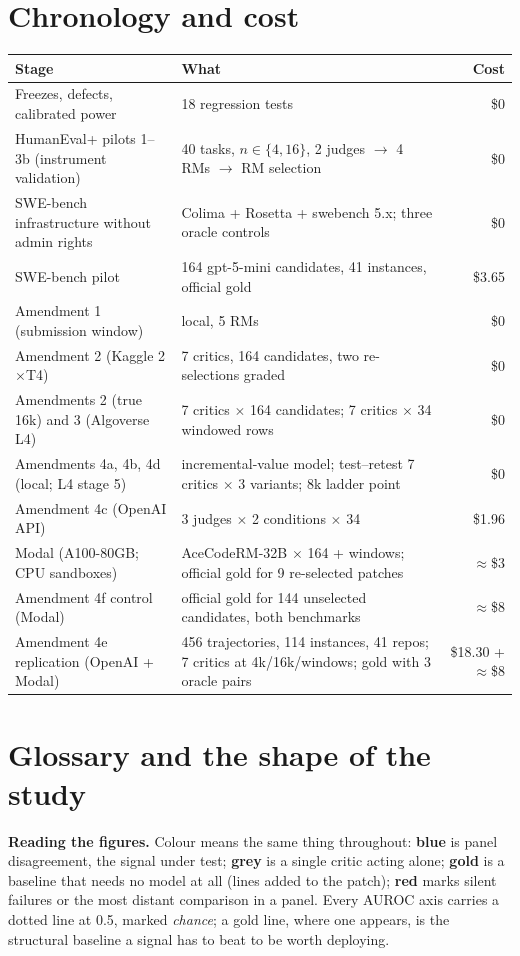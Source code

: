 \documentclass[11pt]{article}
\begin{document}
\appendix
\section{Chronology and cost}
\footnotesize
\begin{tabularx}{\linewidth}{lXr}\toprule
Stage & What & Cost \\\midrule
Freezes, defects, calibrated power & 18 regression tests & \$0 \\
HumanEval+ pilots 1--3b (instrument validation) & 40 tasks, $n\in\{4,16\}$, 2 judges $\to$ 4 RMs $\to$ RM selection & \$0 \\
SWE-bench infrastructure without admin rights & Colima + Rosetta + swebench 5.x; three oracle controls & \$0 \\
SWE-bench pilot & 164 gpt-5-mini candidates, 41 instances, official gold & \$3.65 \\
Amendment 1 (submission window) & local, 5 RMs & \$0 \\
Amendment 2 (Kaggle 2$\times$T4) & 7 critics, 164 candidates, two re-selections graded & \$0 \\
Amendments 2 (true 16k) and 3 (Algoverse L4) & 7 critics $\times$ 164 candidates; 7 critics $\times$ 34 windowed rows & \$0 \\
Amendments 4a, 4b, 4d (local; L4 stage 5) & incremental-value model; test--retest 7 critics $\times$ 3 variants; 8k ladder point & \$0 \\
Amendment 4c (OpenAI API) & 3 judges $\times$ 2 conditions $\times$ 34 & \$1.96 \\
Modal (A100-80GB; CPU sandboxes) & AceCodeRM-32B $\times$ 164 + windows; official gold for 9 re-selected patches & $\approx$\$3 \\
Amendment 4f control (Modal) & official gold for 144 unselected candidates, both benchmarks & $\approx$\$8 \\
Amendment 4e replication (OpenAI + Modal) & 456 trajectories, 114 instances, 41 repos; 7 critics at 4k/16k/windows; gold with 3 oracle pairs & \$18.30 + $\approx$\$8 \\\bottomrule
\end{tabularx}

\section{Glossary and the shape of the study}
\footnotesize
\textbf{Reading the figures.} Colour means the same thing throughout: \textcolor[HTML]{2b6cb0}{\textbf{blue}} is panel disagreement, the signal under test; \textcolor[HTML]{7f8c8d}{\textbf{grey}} is a single critic acting alone; \textcolor[HTML]{b7791f}{\textbf{gold}} is a baseline that needs no model at all (lines added to the patch); \textcolor[HTML]{c0392b}{\textbf{red}} marks silent failures or the most distant comparison in a panel. Every AUROC axis carries a dotted line at 0.5, marked \emph{chance}; a gold line, where one appears, is the structural baseline a signal has to beat to be worth deploying.
\end{document}
